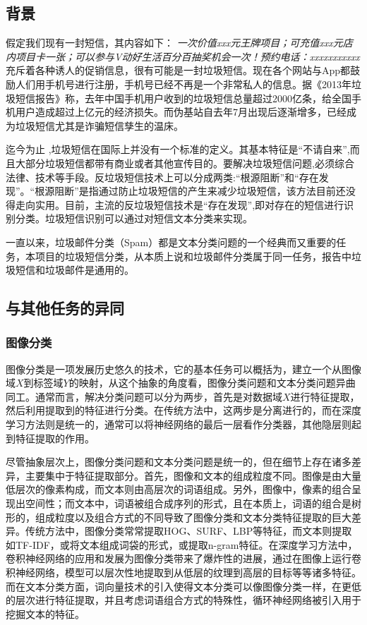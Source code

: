 \documentclass[a4paper]{article}
\begin{document}
\subsection{背景}
假定我们现有一封短信，其内容如下：
\textit{一次价值xxx元王牌项目；可充值xxx元店内项目卡一张；可以参与V动好生活百分百抽奖机会一次！预约电话：xxxxxxxxxxx}充斥着各种诱人的促销信息，很有可能是一封垃圾短信。现在各个网站与App都鼓励人们用手机号进行注册，手机号已经不再是一个非常私人的信息。据《2013年垃圾短信报告》称，去年中国手机用户收到的垃圾短信总量超过2000亿条，给全国手机用户造成超过上亿元的经济损失。而伪基站自去年7月出现后逐渐增多，已经成为垃圾短信尤其是诈骗短信孳生的温床。

迄今为止 ,垃圾短信在国际上并没有一个标准的定义。其基本特征是“不请自来”,而且大部分垃圾短信都带有商业或者其他宣传目的\cite{王斌2005基于内容的垃圾邮件过滤技术综述}。要解决垃圾短信问题,必须综合法律、技术等手段。反垃圾短信技术上可以分成两类:“根源阻断”和“存在发现”。“根源阻断”是指通过防止垃圾短信的产生来减少垃圾短信，该方法目前还没得走向实用。目前，主流的反垃圾短信技术是“存在发现”,即对存在的短信进行识别分类。垃圾短信识别可以通过对短信文本分类来实现。

一直以来，垃圾邮件分类（Spam）都是文本分类问题的一个经典而又重要的任务，本项目的垃圾短信分类，从本质上说和垃圾邮件分类属于同一任务，报告中垃圾短信和垃圾邮件是通用的。

\subsection{与其他任务的异同}
\subsubsection{图像分类}
图像分类是一项发展历史悠久的技术，它的基本任务可以概括为，建立一个从图像域$X$到标签域$Y$的映射，从这个抽象的角度看，图像分类问题和文本分类问题异曲同工。通常而言，解决分类问题可以分为两步，首先是对数据域$X$进行特征提取，然后利用提取到的特征进行分类。在传统方法中，这两步是分离进行的，而在深度学习方法则是统一的，通常可以将神经网络的最后一层看作分类器，其他隐层则起到特征提取的作用。

尽管抽象层次上，图像分类问题和文本分类问题是统一的，但在细节上存在诸多差异，主要集中于特征提取部分。首先，图像和文本的组成粒度不同。图像是由大量低层次的像素构成，而文本则由高层次的词语组成。另外，图像中，像素的组合呈现出空间性；而文本中，词语被组合成序列的形式，且在本质上，词语的组合是树形的，组成粒度以及组合方式的不同导致了图像分类和文本分类特征提取的巨大差异。传统方法中，图像分类常常提取HOG、SURF、LBP等特征，而文本则提取如TF-IDF，或将文本组成词袋的形式，或提取n-gram特征。在深度学习方法中，卷积神经网络的应用和发展为图像分类带来了爆炸性的进展，通过在图像上运行卷积神经网络，模型可以层次性地提取到从低层的纹理到高层的目标等等诸多特征。而在文本分类方面，词向量技术的引入使得文本分类可以像图像分类一样，在更低的层次进行特征提取，并且考虑词语组合方式的特殊性，循环神经网络被引入用于挖掘文本的特征。
\end{document}

